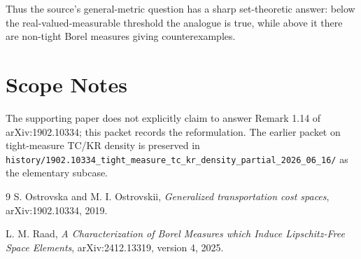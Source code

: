 \documentclass[11pt]{article}
\begin{document}
Thus the source's general-metric question has a sharp set-theoretic answer:
below the real-valued-measurable threshold the analogue is true, while above it
there are non-tight Borel measures giving counterexamples.

\section*{Scope Notes}

The supporting paper does not explicitly claim to answer Remark 1.14 of
arXiv:1902.10334; this packet records the reformulation. The earlier packet
on tight-measure TC/KR density is preserved in
\texttt{history/1902.10334\_tight\_measure\_tc\_kr\_density\_partial\_2026\_06\_16/}
as the elementary subcase.

\begin{thebibliography}{9}
S. Ostrovska and M. I. Ostrovskii,
\emph{Generalized transportation cost spaces}, arXiv:1902.10334, 2019.

L. M. Raad,
\emph{A Characterization of Borel Measures which Induce Lipschitz-Free Space
Elements}, arXiv:2412.13319, version 4, 2025.
\end{thebibliography}
\end{document}
